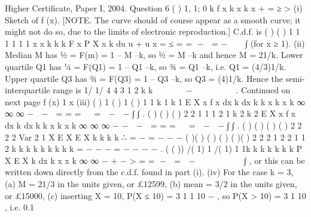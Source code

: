 Higher Certificate, Paper I, 2004. Question 6
( ) 1, 1; 0 k
f x k x k
x + = ≥ >
(i) Sketch of f (x).
[NOTE. The curve should of course appear as a smooth curve; it might not do so,
due to the limits of electronic reproduction.]
C.d.f. is ( ) ( ) 1 1
1
1 1 1
x
x
k k k
F x P X x k du
u + u x
= ≤ = = −  = −   ∫ (for x ≥ 1).
(ii) Median M has ½ = F(m) = 1 – M –k, so ½ = M –k and hence M = 21/k.
Lower quartile Q1 has ¼ = F(Q1) = 1 – Q1
–k, so ¾ = Q1
–k, i.e. Q1 = (4/3)1/k.
Upper quartile Q3 has ¾ = F(Q3) = 1 – Q3
–k, so Q3 = (4)1/k.
Hence the semi-interquartile range is
1/
1/ 4
4
3
1
2
k
k      −   
   
.
Continued on next page
f (x)
1 x
(iii) ( ) 1 ( ) 1 ( ) 1
1 k 1 k 1
E X x f x dx k dx k k
x k x k
∞
∞ ∞
−
 −  = = =   =  −  −
∫ ∫ .
( ) ( ) ( )
2 2
1 1 1 2
1 k 2 k 2
E X x f x dx k dx k k
x k x k
∞
∞ ∞
− −
 −  = = =   =  −  −
∫ ∫ .
( ) ( ) { ( )} ( )
2
2 2
2 Var
2 1
X E X E X k k
k k
∴ = − = −
− −
( )( )
{( ) ( )} ( )( )
2
2 2 1 2
2 1 1 2
k k k k k
k k k k
= − − − =
− − − −
.
( ( )) /( 1) 1
/( 1)
1 1k
k k k k
k k
P X E X k dx k
x x k
∞
∞
− +
−
> = = −  =  −          ∫ , or this can be written down
directly from the c.d.f. found in part (i).
(iv) For the case k = 3,
(a) M = 21/3 in the units given, or £12599,
(b) mean = 3/2 in the units given, or £15000,
(c) inserting X = 10, P(X ≤ 10) = 3
1 1
10
− , so P(X > 10) = 3
1
10
, i.e. 0.1%

